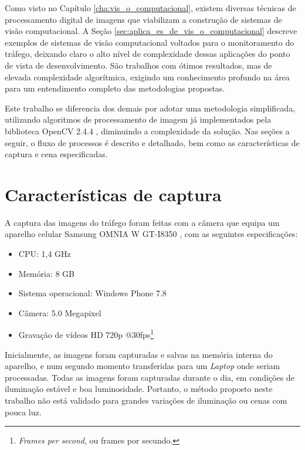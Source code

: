 
Como visto no Capítulo \ref{cha:vis_o_computacional}, existem diversas técnicas de processamento digital de imagens que viabilizam a construção de sistemas de visão computacional. A Seção \ref{sec:aplica_es_de_vis_o_computacional} descreve exemplos de sistemas de visão computacional voltados para o monitoramento do tráfego, deixando claro o alto nível de complexidade dessas aplicações do ponto de vista de desenvolvimento. São trabalhos com ótimos resultados, mas de elevada complexidade algorítmica, exigindo um conhecimento profundo na área para um entendimento completo das metodologias propostas.

Este trabalho se diferencia dos demais por adotar uma metodologia simplificada, utilizando algoritmos de processamento de imagem já implementados pela biblioteca OpenCV 2.4.4 \citep{opencv_library}, diminuindo a complexidade da solução. Nas seções a seguir, o fluxo de processos é descrito e detalhado, bem como as características de captura e cena especificadas.

\section{Características de captura} %
\label{sec:caracter_sticas_de_captura}

A captura das imagens do tráfego foram feitas com a câmera que equipa um aparelho celular Samsung OMNIA W GT-I8350 \citep{omnia:2013:online}, com as seguintes especificações:

\begin{itemize}
  \item CPU: 1,4 GHz
  \item Memória: 8 GB
  \item Sistema operacional: Windows Phone 7.8
  \item Câmera: 5.0 Megapixel
  \item Gravação de vídeos HD 720p @30fps\footnote{\textit{Frames per second}, ou frames por secundo.}
\end{itemize}

Inicialmente, as imagens foram capturadas e salvas na memória interna do aparelho, e num segundo momento transferidas para um \textit{Laptop} onde seriam processadas. Todas as imagens foram capturadas durante o dia, em condições de iluminação estável e boa luminosidade. Portanto, o método proposto neste trabalho não está validado para grandes variações de iluminação ou cenas com pouca luz.

